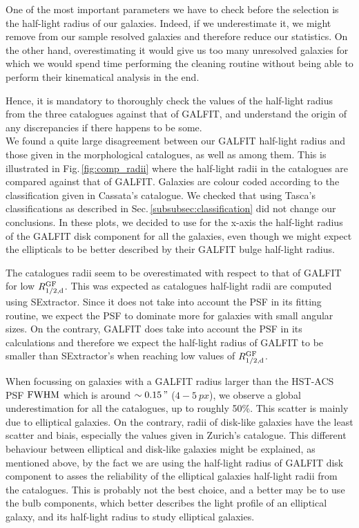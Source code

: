 One of the most important parameters we have to check before the selection is the half-light radius of our galaxies. Indeed, if we underestimate it, we might remove from our sample resolved galaxies and therefore reduce our statistics. On the other hand, overestimating it would give us too many unresolved galaxies for which we would spend time performing the cleaning routine without being able to perform their kinematical analysis in the end.
 
Hence, it is mandatory to thoroughly check the values of the half-light radius from the three catalogues against that of GALFIT, and understand the origin of any discrepancies if there happens to be some. \\

We found a quite large disagreement between our GALFIT half-light radius and those given in the morphological catalogues, as well as among them. This is illustrated in Fig.\,\ref{fig:comp_radii} where the half-light radii in the catalogues are compared against that of GALFIT. Galaxies are colour coded according to the classification given in Cassata's catalogue. We checked that using Tasca's classifications as described in Sec.\,\ref{subsubsec:classification} did not change our conclusions. In these plots, we decided to use for the x-axis the half-light radius of the GALFIT disk component for all the galaxies, even though we might expect the ellipticals to be better described by their GALFIT bulge half-light radius.

The catalogues radii seem to be overestimated with respect to that of GALFIT for low $R_{1/2 , \rm{d}}^{\rm{GF}}$. This was expected as catalogues half-light radii are computed using SExtractor. Since it does not take into account the PSF in its fitting routine, we expect the PSF to dominate more for galaxies with small angular sizes. On the contrary, GALFIT does take into account the PSF in its calculations and therefore we expect the half-light radius of GALFIT to be smaller than SExtractor's when reaching low values of $R_{1/2 , \rm{d}}^{\rm{GF}}$. 

When focussing on galaxies with a GALFIT radius larger than the HST-ACS PSF $\rm{FWHM}$ which is around $\sim \SI{0.15}{"}$ ($4 - \SI{5}{px}$), we observe a global underestimation for all the catalogues, up to roughly 50\%. This scatter is mainly due to elliptical galaxies. On the contrary, radii of disk-like galaxies have the least scatter and biais, especially the values given in Zurich's catalogue. This different behaviour between elliptical and disk-like galaxies might be explained, as mentioned above, by the fact we are using the half-light radius of GALFIT disk component to asses the reliability of the elliptical galaxies half-light radii from the catalogues. This is probably not the best choice, and a better may be to use the bulb components, which better describes the light profile of an elliptical galaxy, and its half-light radius to study elliptical galaxies.\\

